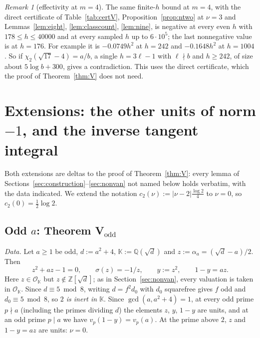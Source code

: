 \documentclass[11pt]{amsart}
\theoremstyle{definition}
\theoremstyle{remark}
\newtheorem{remark}[theorem]{Remark}
\numberwithin{equation}{section}
\newcommand{\ZZ}{\mathbb{Z}}
\newcommand{\QQ}{\mathbb{Q}}
\newcommand{\KK}{\mathbb{K}}
\newcommand{\cO}{\mathcal{O}}
\begin{document}
\begin{remark}[effectivity at $m=4$]
The same finite-$h$ bound at $m=4$, with the direct certificate of Table~\ref{tab:certV}, Proposition~\ref{prop:ntwo} at $\nu=3$
and Lemmas~\ref{lem:eight}, \ref{lem:classcount}, \ref{lem:nine}, is negative at every even $h$ with $178\le h\le40000$
and at every sampled $h$ up to $6\cdot10^5$; the last nonnegative value is at $h=176$. For example it is $-0.0749h^2$ at
$h=242$ and $-0.1648h^2$ at $h=1004$. So if $\chi_2(\sqrt{17}-4)=a/b$, a single $h=3\ell-1$ with $\ell\nmid b$ and
$h\ge242$, of size about $5\log b+300$, gives a contradiction. This uses the direct certificate, which the proof of
Theorem~\ref{thm:V} does not need.
\end{remark}

\section{Extensions: the other units of norm \texorpdfstring{$-1$}{-1}, and the inverse tangent integral}\label{sec:ext}

Both extensions are deltas to the proof of Theorem~\ref{thm:V}: every lemma of
Sections~\ref{sec:construction}--\ref{sec:nonvan} not named below holds verbatim, with the data indicated. We extend the
notation $c_2(\nu):=|\nu-2|\frac{\log2}4$ to $\nu=0$, so $c_2(0)=\frac12\log2$.

\subsection{Odd \texorpdfstring{$a$}{a}: Theorem V\texorpdfstring{$_{\mathrm{odd}}$}{\_odd}}\label{sec:odd-a}
\emph{Data.} Let $a\ge1$ be odd, $d:=a^2+4$, $\KK:=\QQ(\sqrt d)$ and $z:=\alpha_a=(\sqrt d-a)/2$. Then
\[
  z^2+az-1=0,\qquad\sigma(z)=-1/z,\qquad y:=z^2,\qquad 1-y=az .
\]
Here $z\in\cO_\KK$ but $z\notin\ZZ[\sqrt d]$; as in Section~\ref{sec:nonvan}, every valuation is taken in $\cO_\KK$. Since
$d\equiv5\bmod8$, writing $d=f^2d_0$ with $d_0$ squarefree gives $f$ odd and $d_0\equiv5\bmod8$, so \emph{$2$ is inert in
$\KK$}. Since $\gcd(a,a^2+4)=1$, at every odd prime $p\nmid a$ (including the primes dividing $d$) the elements $z$, $y$,
$1-y$ are units, and at an odd prime $p\mid a$ we have $v_p(1-y)=v_p(a)$. At the prime above $2$, $z$ and $1-y=az$ are
units: $\nu=0$.
\end{document}
